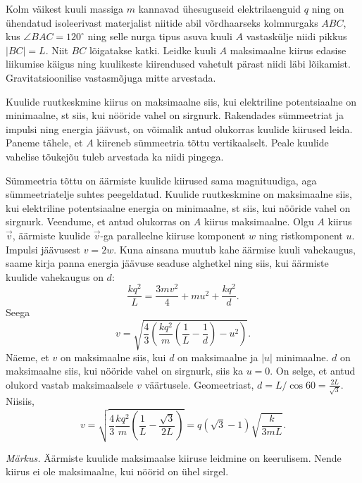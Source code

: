 
Kolm väikest kuuli massiga $m$ kannavad ühesuguseid elektrilaenguid $q$ ning on ühendatud isoleerivast materjalist niitide abil võrdhaarseks kolmnurgaks $ABC$, kus $\angle BAC=120^\circ$ ning selle nurga tipus asuva kuuli $A$ vastaskülje niidi pikkus $|BC|=L$. Niit $BC$ lõigatakse katki. Leidke \osa kuuli $A$ maksimaalne kiirus edasise liikumise käigus ning \osa kuulikeste kiirendused vahetult pärast niidi läbi lõikamist. Gravitatsioonilise vastasmõjuga mitte arvestada.

\hint
\osa Kuulide ruutkeskmine kiirus on maksimaalne siis, kui elektriline potentsiaalne on minimaalne, st siis, kui nööride vahel on sirgnurk. Rakendades sümmeetriat ja impulsi ning energia jäävust, on võimalik antud olukorras kuulide kiirused leida.\\
\osa Paneme tähele, et $A$ kiireneb sümmeetria tõttu vertikaalselt. Peale kuulide vahelise tõukejõu tuleb arvestada ka niidi pingega.

\solu
\osa Sümmeetria tõttu on äärmiste kuulide kiirused sama magnituudiga, aga sümmeetriatelje suhtes peegeldatud.
Kuulide ruutkeskmine on maksimaalne siis, kui elektriline potentsiaalne energia on minimaalne, st siis, kui nööride vahel on sirgnurk. Veendume, et antud olukorras on $A$ kiirus maksimaalne. Olgu $A$ kiirus $\vec v$, äärmiste kuulide $\vec v$-ga paralleelne kiiruse komponent $w$ ning ristkomponent $u$. Impulsi jäävusest $v = 2w$.
Kuna ainsana muutub kahe äärmise kuuli vahekaugus, saame kirja panna energia jäävuse seaduse alghetkel ning siis, kui äärmiste kuulide vahekaugus on $d$:
\[
\frac{kq^2}{L} = \frac{3mv^2}{4} + mu^2 + \frac{kq^2}{d}.
\]
Seega
\[
v = \sqrt{\frac{4}{3}\left(\frac{kq^2}{m}\left(\frac{1}{L} - \frac{1}{d}\right) - u^2\right)}.
\]
Näeme, et $v$ on maksimaalne siis, kui $d$ on maksimaalne ja $|u|$ minimaalne. $d$ on maksimaalne siis, kui nööride vahel on sirgnurk, siis ka $u = 0$. On selge, et antud olukord vastab maksimaalsele $v$ väärtusele. Geomeetriast, $d = L/\cos 60 = \frac{2L}{\sqrt 3}$. Niisiis,
\[
v = \sqrt{\frac{4}{3}\frac{kq^2}{m}\left(\frac{1}{L}-\frac{\sqrt{3}}{2L}\right)} = q\left(\sqrt{3} - 1\right)\sqrt{\frac{k}{3mL}}.
\]

\emph{Märkus.} Äärmiste kuulide maksimaalse kiiruse leidmine on keerulisem. Nende kiirus ei ole maksimaalne, kui nöörid on ühel sirgel.

